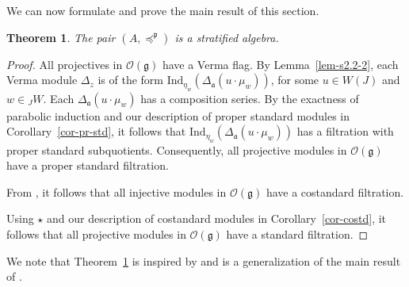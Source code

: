 \documentclass[a4paper]{amsart}
\newtheorem{theorem}{Theorem}
\begin{document}
We can now formulate and prove the main result of this section.

\begin{theorem}\label{thm-main-1}
The pair $(A,{\preceq^\mathfrak{p}})$ is a stratified algebra.
\end{theorem}

\begin{proof}
All projectives in $\mathcal{O}(\mathfrak{g})$ have a Verma flag.
By Lemma~\ref{lem-s2.2-2}, each Verma module 
$\Delta_z$ is of the form 
$\mathrm{Ind}_{\eta_w}(\Delta_\mathfrak{a}(u\cdot \mu_w))$,
for some $u\in W(J)$ and $w\in {}_JW$. Each 
$\Delta_\mathfrak{a}(u\cdot \mu_w)$ has a composition series. 
By the exactness of parabolic induction and our description of 
proper standard modules in Corollary~\ref{cor-pr-std}, it follows
that $\mathrm{Ind}_{\eta_w}(\Delta_\mathfrak{a}(u\cdot \mu_w))$ 
has a filtration with 
proper standard subquotients. Consequently, all projective modules
in $\mathcal{O}(\mathfrak{g})$ have a proper standard filtration.

From \cite[Theorem~1]{Fr}, it follows that all injective modules in 
$\mathcal{O}(\mathfrak{g})$ have a costandard filtration.

Using $\star$ and our description of 
costandard modules in Corollary~\ref{cor-costd}, it follows
that all projective modules
in $\mathcal{O}(\mathfrak{g})$ have a standard filtration.
\end{proof}

We note that Theorem~\ref{thm-main-1} is inspired by and is a
generalization of the main result of \cite{FKM}.
\end{document}
